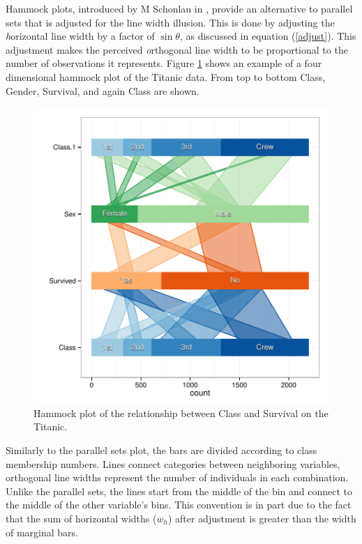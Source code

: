 \documentclass[journal]{vgtc}\usepackage{graphicx, color}
\begin{document}
Hammock plots, introduced by M Schonlau in \citep{schonlau:2003}, provide an alternative to parallel sets that is adjusted for the line width illusion. This is done by  adjusting the { \emph horizontal} line width by  a factor of $\sin \theta$, as discussed in equation (\ref{adjust}). This adjustment makes the perceived {\emph orthogonal} line width to be proportional to the number of observations it represents. 
 Figure \ref{hammock} shows an example of a four dimensional hammock plot of the Titanic data. From top to bottom Class, Gender, Survival, and again Class are shown. 
\begin{figure}
\centering
\includegraphics[width=\linewidth]{images/hammock-titanic}
\caption{\label{hammock} Hammock plot of the relationship between Class and Survival on the Titanic. }
\end{figure}

Similarly to the parallel sets plot, the bars are divided according to class membership numbers.  Lines connect categories between neighboring variables, orthogonal line widths  represent the number of individuals in each combination. Unlike the parallel sets, the lines start from the middle of the bin and connect to the middle of the other variable's bins. This convention is in part due to the fact that the sum of  horizontal widths ($w_h$) after adjustment is greater than the width of marginal bars.
\end{document}
